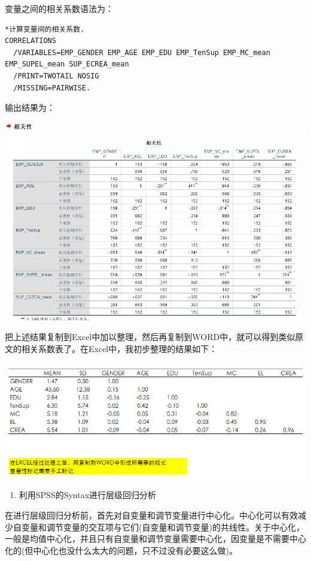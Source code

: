 \documentclass[
]{book}
\providecommand{\tightlist}{%
  \setlength{\itemsep}{0pt}\setlength{\parskip}{0pt}}
\begin{document}
变量之间的相关系数语法为：

\begin{verbatim}
*计算变量间的相关系数.
CORRELATIONS
  /VARIABLES=EMP_GENDER EMP_AGE EMP_EDU EMP_TenSup EMP_MC_mean EMP_SUPEL_mean SUP_ECREA_mean
  /PRINT=TWOTAIL NOSIG
  /MISSING=PAIRWISE.
\end{verbatim}

输出结果为：

\includegraphics{figs/1316.png}

把上述结果复制到Excel中加以整理，然后再复制到WORD中，就可以得到类似原文的相关系数表了。在Excel中，我初步整理的结果如下：

\includegraphics{figs/1317.png}

\begin{enumerate}
\def\labelenumi{\arabic{enumi}.}
\setcounter{enumi}{1}
\tightlist
\item
  利用SPSS的Syntax进行层级回归分析
\end{enumerate}

在进行层级回归分析前，首先对自变量和调节变量进行中心化。中心化可以有效减少自变量和调节变量的交互项与它们(自变量和调节变量)的共线性。关于中心化，一般是均值中心化，并且只有自变量和调节变量需要中心化，因变量是不需要中心化的(但中心化也没什么太大的问题，只不过没有必要这么做)。
\end{document}
